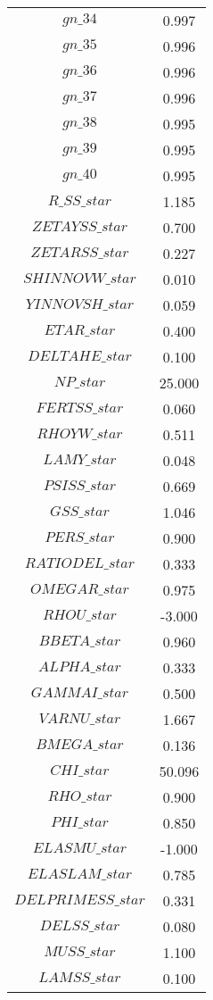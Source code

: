 \begin{center}
\begin{longtable}{cc}
$gn\_34$ 	 & 	 0.997 \\
$gn\_35$ 	 & 	 0.996 \\
$gn\_36$ 	 & 	 0.996 \\
$gn\_37$ 	 & 	 0.996 \\
$gn\_38$ 	 & 	 0.995 \\
$gn\_39$ 	 & 	 0.995 \\
$gn\_40$ 	 & 	 0.995 \\
$R\_SS\_star$ 	 & 	 1.185 \\
$ZETAYSS\_star$ 	 & 	 0.700 \\
$ZETARSS\_star$ 	 & 	 0.227 \\
$SHINNOVW\_star$ 	 & 	 0.010 \\
$YINNOVSH\_star$ 	 & 	 0.059 \\
$ETAR\_star$ 	 & 	 0.400 \\
$DELTAHE\_star$ 	 & 	 0.100 \\
$NP\_star$ 	 & 	 25.000 \\
$FERTSS\_star$ 	 & 	 0.060 \\
$RHOYW\_star$ 	 & 	 0.511 \\
$LAMY\_star$ 	 & 	 0.048 \\
$PSISS\_star$ 	 & 	 0.669 \\
$GSS\_star$ 	 & 	 1.046 \\
$PERS\_star$ 	 & 	 0.900 \\
$RATIODEL\_star$ 	 & 	 0.333 \\
$OMEGAR\_star$ 	 & 	 0.975 \\
$RHOU\_star$ 	 & 	 -3.000 \\
$BBETA\_star$ 	 & 	 0.960 \\
$ALPHA\_star$ 	 & 	 0.333 \\
$GAMMAI\_star$ 	 & 	 0.500 \\
$VARNU\_star$ 	 & 	 1.667 \\
$BMEGA\_star$ 	 & 	 0.136 \\
$CHI\_star$ 	 & 	 50.096 \\
$RHO\_star$ 	 & 	 0.900 \\
$PHI\_star$ 	 & 	 0.850 \\
$ELASMU\_star$ 	 & 	 -1.000 \\
$ELASLAM\_star$ 	 & 	 0.785 \\
$DELPRIMESS\_star$ 	 & 	 0.331 \\
$DELSS\_star$ 	 & 	 0.080 \\
$MUSS\_star$ 	 & 	 1.100 \\
$LAMSS\_star$ 	 & 	 0.100 \\

\end{longtable}
\end{center}
